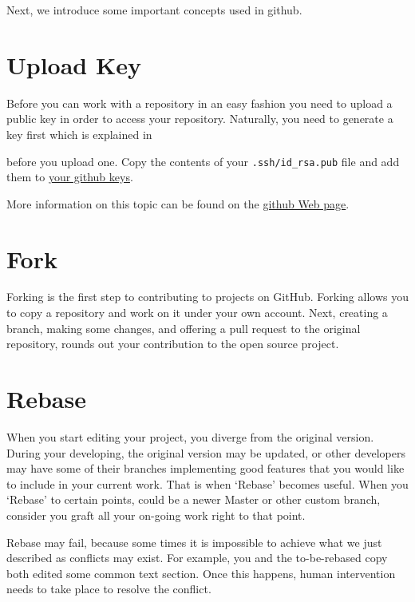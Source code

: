 
Next, we introduce some important concepts used in github.

\section{Upload Key}\label{upload-key}

Before you can work with a repository in an easy fashion you need to
upload a public key in order to access your repository. Naturally, you
need to generate a key first which is explained in 


before you upload one. Copy the contents of your
\verb|.ssh/id_rsa.pub| file and add them to
\href{https://github.com/settings/keys}{your github keys}.

More information on this topic can be found on the
\href{https://help.github.com/articles/adding-a-new-ssh-key-to-your-github-account/}{github
  Web page}.

\section{Fork}\label{fork}

Forking is the first step to contributing to projects on GitHub. Forking
allows you to copy a repository and work on it under your own account.
Next, creating a branch, making some changes, and offering a pull
request to the original repository, rounds out your contribution to the
open source project.


\section{Rebase}\label{rebase}

When you start editing your project, you diverge from the original
version. During your developing, the original version may be updated, or
other developers may have some of their branches implementing good
features that you would like to include in your current work. That is
when `Rebase' becomes useful. When you `Rebase' to certain points, could
be a newer Master or other custom branch, consider you graft all your
on-going work right to that point.

Rebase may fail, because some times it is impossible to achieve what we
just described as conflicts may exist. For example, you and the to-be-rebased copy
both edited some common text section. Once this happens, human
intervention needs to take place to resolve the conflict.

